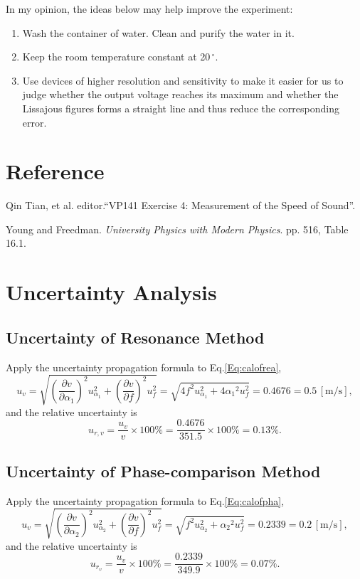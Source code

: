 \documentclass[a4paper]{article}
\begin{document}
\vspace{8pt}
In my opinion, the ideas below may help improve the experiment:
\begin{enumerate}
\item Wash the container of water. Clean and purify the water in it. 
\item Keep the room temperature constant at 20\,$^{\circ}$.
\item Use devices of higher resolution and sensitivity to make it easier for us to judge whether the output voltage reaches its maximum and whether the Lissajous figures forms a straight line and thus reduce the corresponding error.
\end{enumerate}



\section{Reference}

\noindent [1] Qin Tian, et al. editor.``VP141 Exercise 4: Measurement of the Speed of Sound''.

\noindent [2] Young and Freedman. \textit{University Physics with Modern Physics}. pp. 516, Table 16.1.

\newpage



\appendix

\section{Uncertainty Analysis}

\subsection{Uncertainty of Resonance Method}
Apply the uncertainty propagation formula to Eq.\ref{Eq:calofrea},
\[u_v = \sqrt{{(\frac{\partial v}{\partial \alpha_1})}^2u_{\alpha_1}^2 + {(\frac{\partial v}{\partial f})}^2u_f^2} = \sqrt{4 f^2 u_{\alpha_1}^2 + 4 {\alpha_1}^2 u_f^2} = 0.4676 = 0.5 \,[\text{m/s}],\]
and the relative uncertainty is
\[u_{r,v} = \frac{u_v}{v}\times 100\% = \frac{0.4676}{351.5}\times 100\% = 0.13\%.\]

\subsection{Uncertainty of Phase-comparison Method}
Apply the uncertainty propagation formula to Eq.\ref{Eq:calofpha},
\[u_v = \sqrt{{(\frac{\partial v}{\partial \alpha_2})}^2u_{\alpha_2}^2 + {(\frac{\partial v}{\partial f})}^2u_f^2} = \sqrt{ f^2 u_{\alpha_2}^2 + {\alpha_2}^2 u_f^2} = 0.2339 = 0.2 \,[\text{m/s}],\]
and the relative uncertainty is
\[u_{r_v} = \frac{u_v}{v}\times 100\% = \frac{0.2339}{349.9}\times 100\% = 0.07\%.\]
\end{document}
